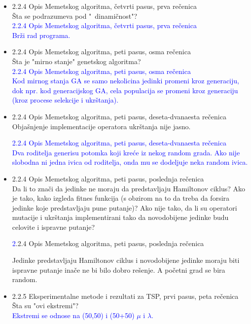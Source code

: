 \documentclass[a4paper]{report}
\newcommand{\odgovor}[1]{\textcolor{blue}{#1}}
\begin{document}
\begin{itemize}
    
    \item 2.2.4 Opis Memetskog algoritma, četvrti pasus, prva rečenica \\
    Šta se podrazumeva pod "\ dinamičnost"?\\
     \odgovor{ 2.2.4 Opis Memetskog algoritma, četvrti pasus, prva rečenica \\
     Brži rad programa.
     }
    
    
    \item 2.2.4 Opis Memetskog algoritma, peti pasus, osma rečenica \\
    Šta je "mirno stanje" \hspace{0.075cm} genetskog algoritma? \\
     \odgovor{  2.2.4 Opis Memetskog algoritma, peti pasus, osma rečenica \\
    Kod mirnog stanja GA se samo nekolicina jedinki promeni kroz generaciju, dok npr. kod generacijskog GA, cela populacija se promeni kroz generaciju (kroz procese selekcije i ukrštanja). \\
    }
    \item 2.2.4 Opis Memetskog algoritma, peti pasus, deseta-dvanaesta rečenica \\
    Objašnjenje implementacije operatora ukrštanja nije jasno.
    
     \odgovor{ 2.2.4 Opis Memetskog algoritma, peti pasus, deseta-dvanaesta rečenica \\
     Dva roditelja generisu potomka koji kreće iz nekog random grada. Ako nije slobodna ni jedna ivica od roditelja, onda mu se dodeljuje neka random ivica.}
     
     
    \item 2.2.4 Opis Memetskog algoritma, peti pasus, poslednja rečenica \\
    Da li to znači da jedinke ne moraju da predstavljaju Hamiltonov ciklus? Ako je tako, kako izgleda fitnes funkcija (s obzirom na to da treba da forsira jedinke koje predstavljaju pune putanje)? Ako nije tako, da li su operatori mutacije i ukrštanja implementirani tako da novodobijene jedinke budu celovite i ispravne putanje?
    
     \odgovor 2.2.4 Opis Memetskog algoritma, peti pasus, poslednja rečenica
     
     Jedinke predstavljaju Hamiltonov ciklus i novodobijene jedinke moraju biti ispravne putanje inače ne bi bilo dobro rešenje. A početni grad se bira random.
     
    \item 2.2.5 Eksperimentalne metode i rezultati za TSP, prvi pasus, peta rečenica \\
    Šta su "ovi ekstremi"?\\
    \odgovor{
    Ekstremi se odnose na (50,50) i (50+50) $\mu$ i $\lambda$.}
    

\end{itemize}
\end{document}
